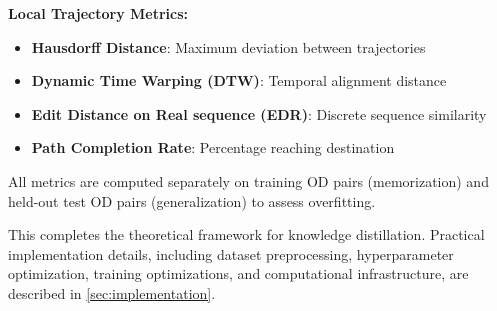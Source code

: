 \textbf{Local Trajectory Metrics:}
\begin{itemize}[noitemsep,topsep=0pt]
\item \textbf{Hausdorff Distance}: Maximum deviation between trajectories
\item \textbf{Dynamic Time Warping (DTW)}: Temporal alignment distance
\item \textbf{Edit Distance on Real sequence (EDR)}: Discrete sequence similarity
\item \textbf{Path Completion Rate}: Percentage reaching destination
\end{itemize}

All metrics are computed separately on training OD pairs (memorization) and held-out test OD pairs (generalization) to assess overfitting.

\bigskip

This completes the theoretical framework for knowledge distillation. Practical implementation details, including dataset preprocessing, hyperparameter optimization, training optimizations, and computational infrastructure, are described in \autoref{sec:implementation}.